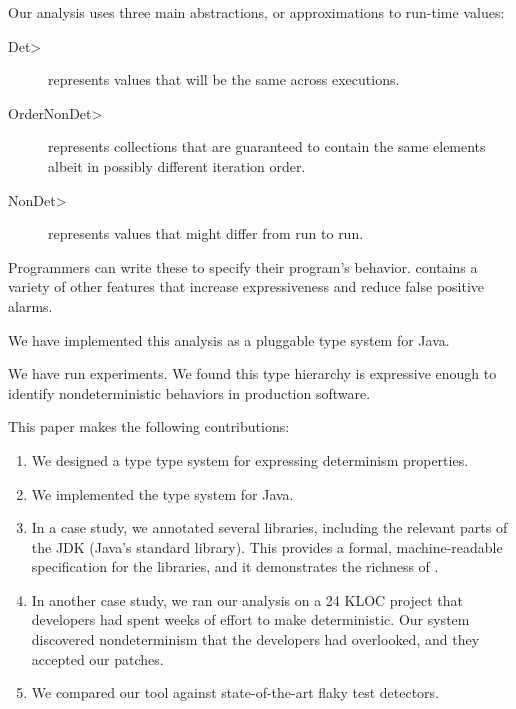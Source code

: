 Our analysis uses three main abstractions, or approximations to run-time values:
\begin{description}
\item[\<Det>] represents values that will be the same across executions.
\item[\<OrderNonDet>] represents collections that are guaranteed to contain the same elements albeit in possibly
different iteration order.
\item[\<NonDet>] represents values that
might differ from run to run.
\end{description}
\noindent
Programmers can write these to specify their program's behavior.
\OurTypeSystem contains a variety of other features that increase
expressiveness and reduce false positive alarms.

We have implemented this analysis as a pluggable type system for Java.

We have run experiments.
We found this type hierarchy
is expressive enough to identify nondeterministic behaviors in production software.

This paper makes the following contributions:
\begin{enumerate}
  \item We designed a type type system for expressing determinism properties.

  \item We implemented the type system for Java.

  \item In a case study, we annotated several libraries, including the
    relevant parts of the JDK (Java's standard library).  This provides a
    formal, machine-readable specification for the libraries, and it
    demonstrates the richness of \ourTypeSystem.

  \item In another case study, we ran our analysis on a 24 KLOC project that
    developers had spent weeks of effort to make deterministic.  Our system
    discovered nondeterminism that the developers had overlooked, and they
    accepted our patches.

  \item We compared our tool against state-of-the-art flaky test
    detectors.
\end{enumerate}


